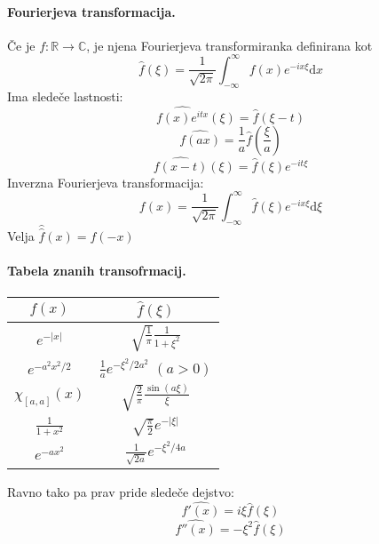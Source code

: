 \documentclass[a4paper]{article}
\newcommand{\dif}{\mathrm{d}}
\newcommand{\C}{\mathbb{C}}
\newcommand{\R}{\mathbb{R}}
\newcommand{\fn}[3]{{#1}\colon {#2} \rightarrow {#3}}
\newcommand{\Int}{\int_{-\infty}^{\infty}}
\begin{document}
\paragraph{Fourierjeva transformacija.} Če je $\fn{f}{\R}{\C}$, je njena Fourierjeva transformiranka definirana kot $$\widehat{f}(\xi) = \frac{1}{\sqrt{2\pi}}\Int f(x)e^{-ix\xi}\dif x$$
Ima sledeče lastnosti:
$$\widehat{f(x)e^{itx}}(\xi) = \widehat{f}(\xi - t)$$
$$\widehat{f(ax)} = \frac{1}{a}\widehat{f}\left(\frac{\xi}{a}\right)$$
$$\widehat{f(x-t)}(\xi) = \widehat{f}(\xi) e^{-it\xi}$$
Inverzna Fourierjeva transformacija:
$$f(x) = \frac{1}{\sqrt{2\pi}}\Int \widehat{f}(\xi) e^{-ix\xi}\dif\xi$$
Velja $\widehat{\widehat{f}}(x) = f(-x)$
\paragraph{Tabela znanih transofrmacij.} \text{}
\begin{table}[h!]
    \centering
    \begin{tabular}{c|c}
        \hline
        $f(x)$ & $\widehat{f}(\xi)$ \\[2mm]
        \hline
        $e^{-|x|}$ & $\sqrt{\frac{1}{\pi}} \frac{1}{1+\xi^2}$ \\[2mm]
        $e^{-a^2x^2/2}$ & $\frac{1}{a}e^{-\xi^2/2a^2}$ $(a>0)$ \\[2mm]
        $\chi_{[a, a]}(x)$ & $\sqrt{\frac{2}{\pi}}\frac{\sin(a\xi)}{\xi}$ \\[2mm]
        $\frac{1}{1+x^2}$ & $\sqrt{\frac{\pi}{2}}e^{-|\xi|}$ \\[2mm]
        $e^{-ax^2}$ & $\frac{1}{\sqrt{2a}} e^{-\xi^2/4a}$
    \end{tabular}
\end{table}
Ravno tako pa prav pride sledeče dejstvo:
$$\widehat{f'(x)} = i\xi\widehat{f}(\xi)$$
$$\widehat{f''(x)} = -\xi^2\widehat{f}(\xi)$$
\end{document}
